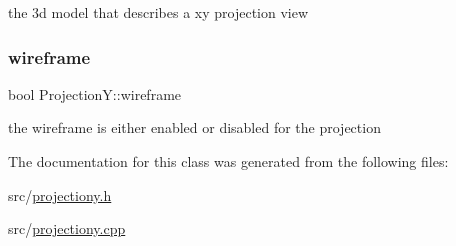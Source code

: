 the 3d model that describes a xy projection view 

\mbox{\label{class_projection_y_a8ac9c3d56c5dd9ca94afee7bfe4526d1}} 
\subsubsection{\texorpdfstring{wireframe}{wireframe}}
{\footnotesize\ttfamily bool Projection\+Y\+::wireframe}



the wireframe is either enabled or disabled for the projection 



The documentation for this class was generated from the following files\+:\begin{DoxyCompactItemize}
\item 
src/\mbox{\hyperlink{projectiony_8h}{projectiony.\+h}}\item 
src/\mbox{\hyperlink{projectiony_8cpp}{projectiony.\+cpp}}\end{DoxyCompactItemize}
